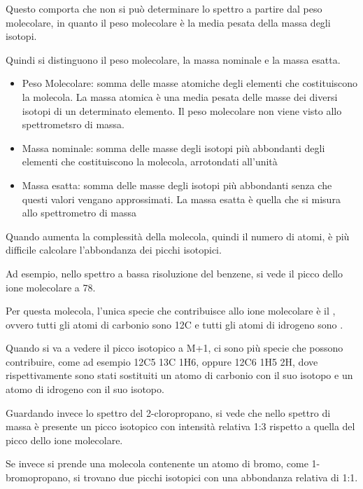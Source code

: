 
Questo comporta che non si può determinare lo spettro a partire dal peso
molecolare, in quanto il peso molecolare è la media pesata della massa
degli isotopi.

Quindi si distinguono il peso molecolare, la massa nominale e la massa
esatta.
\begin{itemize}
  \item Peso Molecolare: somma delle masse atomiche degli elementi che
  costituiscono la molecola. La massa atomica è una media pesata delle
  masse dei diversi isotopi di un determinato elemento. Il peso molecolare
  non viene visto allo spettrometsro di massa.
  \item Massa nominale: somma
  delle masse degli isotopi più abbondanti degli elementi che
  costituiscono la molecola, arrotondati all'unità
  \item Massa esatta: somma
  delle masse degli isotopi più abbondanti senza che questi valori vengano
  approssimati. La massa esatta è quella che si misura allo spettrometro
  di massa
\end{itemize}

Quando aumenta la complessità della molecola, quindi il numero di atomi,
è più difficile calcolare l'abbondanza dei picchi isotopici.

Ad esempio, nello spettro a bassa risoluzione del benzene, si vede il
picco dello ione molecolare a 78.

Per questa molecola, l'unica specie che contribuisce allo ione
molecolare è il , ovvero tutti gli atomi di carbonio
sono 12C e tutti gli atomi di idrogeno sono .

Quando si va a vedere il picco isotopico a M+1, ci sono più specie che
possono contribuire, come ad esempio 12C5 13C 1H6, oppure 12C6 1H5 2H,
dove rispettivamente sono stati sostituiti un atomo di carbonio con il
suo isotopo e un atomo di idrogeno con il suo isotopo.


Guardando invece lo spettro del 2-cloropropano, si vede che nello
spettro di massa è presente un picco isotopico con intensità relativa
1:3 rispetto a quella del picco dello ione molecolare.

Se invece si prende una molecola contenente un atomo di bromo, come
1-bromopropano, si trovano due picchi isotopici con una abbondanza
relativa di 1:1.

